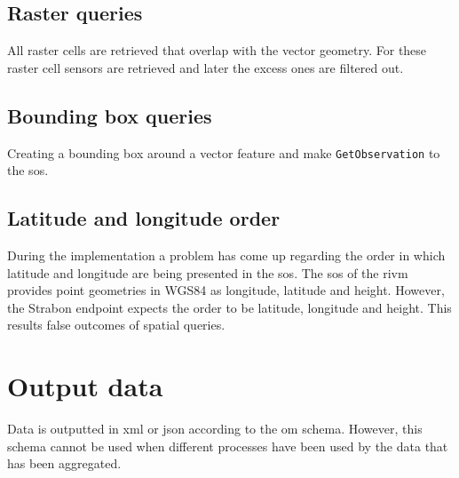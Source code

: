 \subsection{Raster queries}
All raster cells are retrieved that overlap with the vector geometry. For these raster cell sensors are retrieved and later the excess ones are filtered out. 

\subsection{Bounding box queries}
Creating a bounding box around a vector feature and make \texttt{GetObservation} to the \ac{sos}.  

\subsection{Latitude and longitude order}
During the implementation a problem has come up regarding the order in which latitude and longitude are being presented in the \ac{sos}. The \ac{sos} of the \ac{rivm} provides point geometries in WGS84 as longitude, latitude and height. However, the Strabon endpoint expects the order to be latitude, longitude and height. This results false outcomes of spatial queries.    

\section{Output data}
Data is outputted in \ac{xml} or \ac{json} according to the \ac{om} schema. However, this schema cannot be used when different processes have been used by the data that has been aggregated.

 
